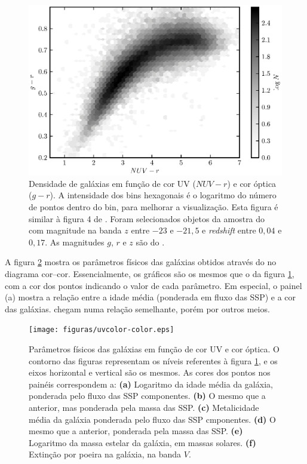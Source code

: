 \begin{figure}
	\includegraphics{figuras/uvcolor-color-density.eps}
	\caption[Densidade de galáxias no diagrama cor--cor UV.]
	{Densidade de galáxias em função de cor UV ($NUV-r$) e cor óptica ($g-r$). A
	intensidade dos bins hexagonais é o logaritmo do número de pontos dentro do
	bin, para melhorar a visualização. Esta figura é similar à figura 4 de
	\citet{Chilingarian2011}. Foram selecionados objetos da amostra do \starlight
	com magnitude na banda $z$ entre $-23$ e $-21,5$ e {\em redshift} entre $0,04$
	e $0,17$. As magnitudes $g$, $r$ e $z$ são do \SDSS.}
	\label{fig:DensityColor}
\end{figure}

A figura \ref{fig:ColorStarlightParam} mostra os parâmetros físicos das galáxias
obtidos através do \starlight no diagrama cor--cor. Essencialmente, os gráficos
são os mesmos que o da figura \ref{fig:DensityColor}, com a cor dos pontos
indicando o valor de cada parâmetro. Em especial, o painel (a) mostra a relação
entre a idade média (ponderada em fluxo das SSP) e a cor das galáxias.
\citeauthor{Chilingarian2011} chegam numa relação semelhante, porém por outros
meios.

\begin{figure}
	\texttt{[image: figuras/uvcolor-color.eps]}
	\caption[Diagrama cor--cor UV para os diversos parâmetros \starlight.]
	{Parâmetros físicos das galáxias em função de cor UV e cor óptica. O contorno
	das figuras representam os níveis referentes à figura \ref{fig:DensityColor},
	e os eixos horizontal e vertical são os mesmos. As cores dos pontos nos painéis
	correspondem a: \textbf{(a)} Logaritmo da idade média da galáxia, ponderada
	pelo fluxo das SSP componentes. \textbf{(b)} O mesmo que a anterior, mas
	ponderada pela massa das SSP. \textbf{(c)} Metalicidade média da galáxia
	ponderada pelo fluxo das SSP cmponentes. \textbf{(d)} O mesmo que a
	anterior, ponderada pela massa das SSP. \textbf{(e)} Logaritmo da massa
	estelar da galáxia, em massas solares. \textbf{(f)} Extinção por poeira na
	galáxia, na banda $V$.}
	\label{fig:ColorStarlightParam}
\end{figure}


